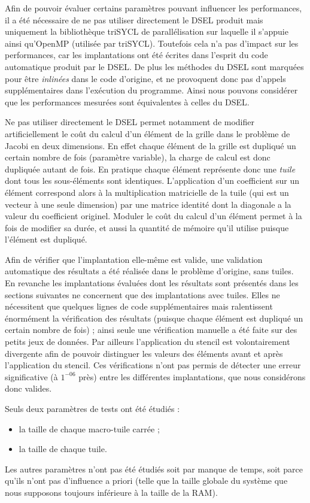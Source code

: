 Afin de pouvoir évaluer certains paramètres pouvant influencer les performances, il a été nécessaire de ne pas utiliser directement le DSEL produit mais uniquement la bibliothèque \textsf{triSYCL} de parallélisation sur laquelle il s'appuie ainsi qu'\textsf{OpenMP} (utilisée par \textsf{triSYCL}). Toutefois cela n'a pas d'impact sur les performances, car les implantations ont été écrites dans l'esprit du code automatique produit par le DSEL. De plus les méthodes du DSEL sont marquées pour être \emph{inlinées} dans le code d'origine, et ne provoquent donc pas d'appels supplémentaires dans l'exécution du programme. Ainsi nous pouvons considérer que les performances mesurées sont équivalentes à celles du DSEL.

Ne pas utiliser directement le DSEL permet notamment de modifier artificiellement le coût du calcul d'un élément de la grille dans le problème de Jacobi en deux dimensions. En effet chaque élément de la grille est dupliqué un certain nombre de fois (paramètre variable), la charge de calcul est donc dupliquée autant de fois. En pratique chaque élément représente donc une \emph{tuile} dont tous les sous-éléments sont identiques. L'application d'un coefficient sur un élément correspond alors à la multiplication matricielle de la tuile (qui est un vecteur à une seule dimension) par une matrice identité dont la diagonale a la valeur du coefficient originel. Moduler le coût du calcul d'un élément permet à la fois de modifier sa durée, et aussi la quantité de mémoire qu'il utilise puisque l'élément est dupliqué.

Afin de vérifier que l'implantation elle-même est valide, une validation automatique des résultats a été réalisée dans le problème d'origine, sans tuiles. En revanche les implantations évaluées dont les résultats sont présentés dans les sections suivantes ne concernent que des implantations avec tuiles. Elles ne nécessitent que quelques lignes de code supplémentaires mais ralentissent énormément la vérification des résultats (puisque chaque élément est dupliqué un certain nombre de fois) ; ainsi seule une vérification manuelle a été faite sur des petits jeux de données. Par ailleurs l'application du stencil est volontairement divergente afin de pouvoir distinguer les valeurs des éléments avant et après l'application du stencil. Ces vérifications n'ont pas permis de détecter une erreur significative (à $1^{-06}$ près) entre les différentes implantations, que nous considérons donc valides. 

Seuls deux paramètres de tests ont été étudiés :
\begin{itemize}
\item la taille de chaque macro-tuile carrée ;
\item la taille de chaque tuile.
\end{itemize}
Les autres paramètres n'ont pas été étudiés soit par manque de temps, soit parce qu'ils n'ont pas d'influence a priori (telle que la taille globale du système que nous supposons toujours inférieure à la taille de la RAM).

